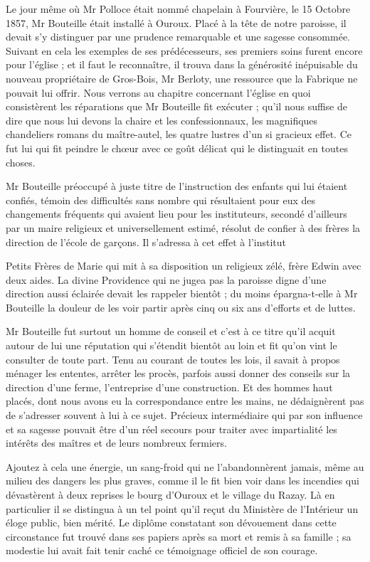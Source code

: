 Le jour même où Mr Polloce était nommé chapelain à Fourvière, le 15 Octobre 1857, Mr Bouteille était installé à Ouroux. Placé à la tête de notre paroisse, il devait s'y distinguer par une prudence remarquable et une sagesse consommée. Suivant en cela les exemples de ses prédécesseurs, ses premiers soins furent encore pour l'église ; et il faut le reconnaître, il trouva dans la générosité inépuisable du nouveau propriétaire de Gros-Bois, Mr Berloty, une ressource que la Fabrique ne pouvait lui offrir. Nous verrons au chapitre concernant l'église en quoi consistèrent les réparations que Mr Bouteille fit exécuter ; qu'il nous suffise de dire que nous lui devons la chaire et les confessionnaux, les magnifiques chandeliers romans du maître-autel, les quatre lustres d'un si gracieux effet. Ce fut lui qui fit peindre le chœur avec ce goût délicat qui le distinguait en toutes choses.

Mr Bouteille préoccupé à juste titre de l'instruction des enfants qui lui étaient confiés, témoin des difficultés sans nombre qui résultaient pour eux des changements fréquents qui avaient lieu pour les instituteurs, secondé d'ailleurs par un maire religieux et universellement estimé, résolut de confier à des frères la direction de l'école de garçons. Il s'adressa à cet effet à l'institut

Petits Frères de Marie qui mit à sa disposition un religieux zélé, frère Edwin avec deux aides. La divine Providence qui ne jugea pas la paroisse digne d'une direction aussi éclairée devait les rappeler bientôt ; du moins épargna-t-elle à Mr Bouteille la douleur de les voir partir après cinq ou six ans d'efforts et de luttes.

Mr Bouteille fut surtout un homme de conseil et c'est à ce titre qu'il acquit autour de lui une réputation qui s'étendit bientôt au loin et fit qu'on vint le consulter de toute part. Tenu au courant de toutes les lois, il savait à propos ménager les ententes, arrêter les procès, parfois aussi donner des conseils sur la direction d'une ferme, l'entreprise d'une construction. Et des hommes haut placés, dont nous avons eu la correspondance entre les mains, ne dédaignèrent pas de s'adresser souvent à lui à ce sujet. Précieux intermédiaire qui par son influence et sa sagesse pouvait être d'un réel secours pour traiter avec impartialité les intérêts des maîtres et de leurs nombreux fermiers.

Ajoutez à cela une énergie, un sang-froid qui ne l'abandonnèrent jamais, même au milieu des dangers les plus graves, comme il le fit bien voir dans les incendies qui dévastèrent à deux reprises le bourg d'Ouroux et le village du Razay. Là en particulier il se distingua à un tel point qu'il reçut du Ministère de l'Intérieur un éloge public, bien mérité. Le diplôme constatant son dévouement dans cette circonstance fut trouvé dans ses papiers après sa mort et remis à sa famille ; sa modestie lui avait fait tenir caché ce témoignage officiel de son courage.

